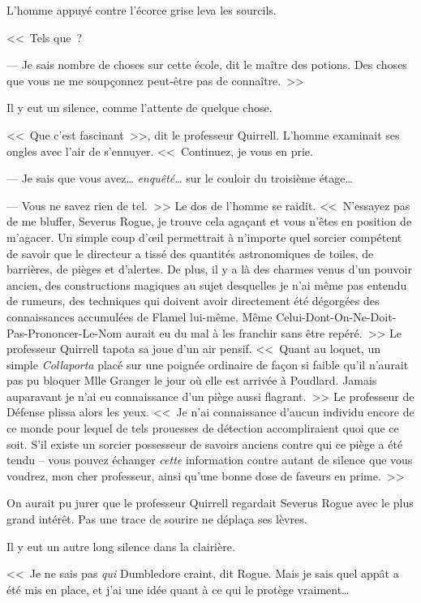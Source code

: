 L'homme appuyé contre l'écorce grise leva les sourcils.

<<~Tels que~?

--- Je sais nombre de choses sur cette école, dit le maître des potions. Des choses que vous ne me soupçonnez peut-être pas de connaître.~>>

Il y eut un silence, comme l'attente de quelque chose.

<<~Que c'est fascinant~>>, dit le professeur Quirrell. L'homme examinait ses ongles avec l'air de s'ennuyer. <<~Continuez, je vous en prie.

--- Je sais que vous avez… \emph{enquêté}… sur le couloir du troisième étage…

--- Vous ne savez rien de tel.~>> Le dos de l'homme se raidit. <<~N'essayez pas de me bluffer, Severus Rogue, je trouve cela agaçant et vous n'êtes en position de m'agacer. Un simple coup d'œil permettrait à n'importe quel sorcier compétent de savoir que le directeur a tissé des quantités astronomiques de toiles, de barrières, de pièges et d'alertes. De plus, il y a là des charmes venus d'un pouvoir ancien, des constructions magiques au sujet desquelles je n'ai même pas entendu de rumeurs, des techniques qui doivent avoir directement été dégorgées des connaissances accumulées de Flamel lui-même. Même Celui-Dont-On-Ne-Doit-Pas-Prononcer-Le-Nom aurait eu du mal à les franchir sans être repéré.~>> Le professeur Quirrell tapota sa joue d'un air pensif. <<~Quant au loquet, un simple \emph{Collaporta} placé sur une poignée ordinaire de façon si faible qu'il n'aurait pas pu bloquer Mlle Granger le jour où elle est arrivée à Poudlard. Jamais auparavant je n'ai eu connaissance d'un piège aussi flagrant.~>> Le professeur de Défense plissa alors les yeux. <<~Je n'ai connaissance d'aucun individu encore de ce monde pour lequel de tels prouesses de détection accompliraient quoi que ce soit. S'il existe un sorcier possesseur de savoirs anciens contre qui ce piège a été tendu -- vous pouvez échanger \emph{cette} information contre autant de silence que vous voudrez, mon cher professeur, ainsi qu'une bonne dose de faveurs en prime.~>>

On aurait pu jurer que le professeur Quirrell regardait Severus Rogue avec le plus grand intérêt. Pas une trace de sourire ne déplaça ses lèvres.

Il y eut un autre long silence dans la clairière.

<<~Je ne sais pas \emph{qui} Dumbledore craint, dit Rogue. Mais je sais quel appât a été mis en place, et j'ai une idée quant à ce qui le protège vraiment…

